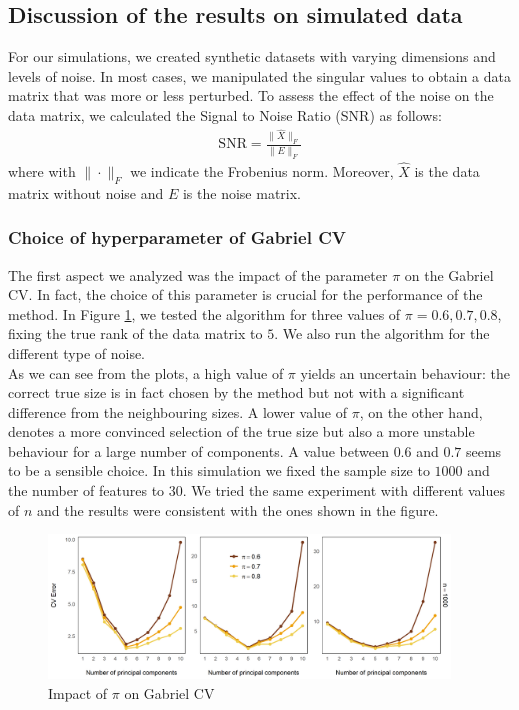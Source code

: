 \documentclass{article}
\begin{document}
\subsection{Discussion of the results on simulated data} 

For our simulations, we created synthetic datasets with varying dimensions 
and levels of noise. In most cases, we manipulated the singular values to obtain 
a data matrix that was more or less perturbed. To assess the effect of the noise 
on the data matrix, we calculated the Signal to Noise Ratio (SNR) as follows:
\begin{gather*}
    \text{SNR} = \frac{\|\hat{X}\|_F}{\|E\|_F}
\end{gather*}
where with $\| \cdot \|_F $ we indicate the Frobenius norm. Moreover, $\hat{X}$ is the data matrix without noise and $E$ is the noise matrix.

\subsubsection{Choice of hyperparameter of Gabriel CV}
The first aspect we analyzed was the impact of the parameter $\pi$ on the Gabriel CV. In fact, the choice of this parameter
is crucial for the performance of the method. In Figure \ref{fig:gabriel_pi}, we tested the algorithm for three values of $\pi = 0.6 , 0.7, 0.8$, 
fixing the true rank of the data matrix to $5$. We also run the algorithm for the different type of noise. \\
As we can see from the plots, 
a high value of $\pi$ yields an uncertain behaviour: the correct true size is in fact chosen by the method but not with a significant 
difference from the neighbouring sizes. A lower value of $\pi$, on the other hand, denotes a more convinced selection of the true size but also 
a more unstable behaviour for a large number of components. A value between $0.6$ and $0.7$ seems to be a sensible choice.
In this simulation we fixed the sample size to $1000$ and the number of features to $30$. We tried the same experiment with different values of $n$
and the results were consistent with the ones shown in the figure.
\begin{figure}[h!]
    \centering
    \includegraphics[width=0.95\textwidth]{Gabriel.png}
    \caption{Impact of $\pi$ on Gabriel CV}
    \label{fig:gabriel_pi}
\end{figure}
\end{document}
